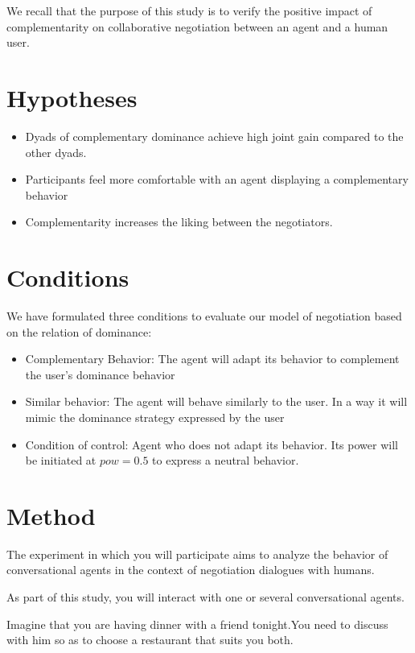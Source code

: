 \documentclass [french]{paper}
\begin{document}
		
		We recall that the purpose of this study is to verify the positive impact of complementarity on collaborative negotiation between an agent and a human user.
	
		
		\section{Hypotheses}
		\begin{itemize}
			\item Dyads of complementary dominance achieve high joint gain  compared to the other dyads.
			\item Participants feel more comfortable with an agent displaying a complementary behavior
			\item Complementarity increases the liking between the negotiators.
		\end{itemize}

			
		\section{Conditions}
			We have formulated three conditions to evaluate our model of negotiation based on the relation of dominance:

			\begin{itemize}
				\item Complementary Behavior: The agent will adapt its behavior to complement the user's dominance behavior
				
				\item Similar behavior: The agent will behave similarly to the user. In a way it will mimic the dominance strategy expressed by the user
				
				\item Condition of control: Agent who does not adapt its behavior. Its power will be initiated at $ pow = 0.5 $ to express a neutral behavior.
			\end{itemize}
			
			
		\section{Method}
			The experiment in which you will participate aims to analyze the behavior of conversational agents in the context of negotiation dialogues with  humans.
			
			As part of this study, you will interact with one or several conversational agents.
			
			Imagine that you are having dinner with a friend tonight.You need to discuss with him so as to choose a restaurant that suits you both.
			
\end{document}
